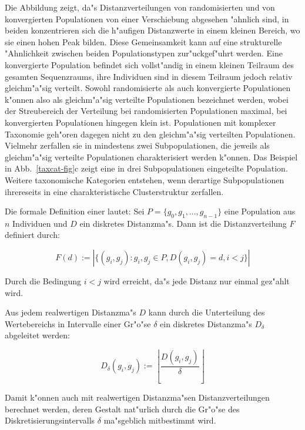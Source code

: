 Die Abbildung zeigt, da"s Distanzverteilungen von randomisierten und von konvergierten Populationen
von einer Verschiebung abgesehen "ahnlich sind, in beiden konzentrieren sich die h"aufigen Distanzwerte
in einem kleinen Bereich, wo sie einen hohen Peak bilden. Diese Gemeinsamkeit kann auf eine strukturelle
"Ahnlichkeit zwischen beiden Populationstypen zur"uckgef"uhrt werden. Eine konvergierte Population befindet
sich vollst"andig in einem kleinen Teilraum des gesamten Sequenzraums, ihre Individuen sind in diesem Teilraum jedoch
relativ gleichm"a"sig verteilt. Sowohl randomisierte als auch konvergierte Populationen k"onnen also als
gleichm"a"sig verteilte Populationen bezeichnet werden, wobei der Streubereich der Verteilung bei
randomisierten Populationen maximal, bei konvergierten Populationen hingegen klein ist. Populationen mit
komplexer Taxonomie geh"oren dagegen nicht zu den gleichm"a"sig verteilten Populationen. Vielmehr zerfallen
sie in mindestens zwei Subpopulationen, die jeweils als gleichm"a"sig verteilte Populationen charakterisiert
werden k"onnen. Das Beispiel in Abb.\ \ref{taxcat-fig}c zeigt eine in drei Subpopulationen eingeteilte
Population. Weitere taxonomische Kategorien entstehen, wenn derartige Subpopulationen ihrereseits in eine
charakteristische Clusterstruktur zerfallen.

Die formale Definition einer  lautet:
Sei $P = \{g_0, g_1, \ldots , g_{n-1}\}$ eine Population aus $n$ Individuen
und $D$ ein diskretes Distanzma"s. Dann ist die Distanzverteilung $F$ definiert
durch:

\begin{equation}
\label{ddistr-eq}
F(d) := | \{(g_i, g_j) : g_i, g_j \in P, D(g_i, g_j) = d, i < j\} |
\end{equation}

Durch die Bedingung $i < j$ wird erreicht, da"s jede Distanz nur
einmal gez"ahlt wird.

Aus jedem realwertigen Distanzma"s $D$ kann durch die Unterteilung des Wertebereichs
in Intervalle einer Gr"o"se $\delta$ ein diskretes Distanzma"s $D_{\delta}$
abgeleitet werden:

\begin{equation}
D_{\delta}(g_i, g_j) := \left\lfloor \frac{D(g_i, g_j)}{\delta} \right\rfloor
\end{equation}

Damit k"onnen auch mit realwertigen Distanzma"sen Distanzverteilungen
berechnet werden, deren Gestalt nat"urlich durch die Gr"o"se des
Diskretisierungsintervalls $\delta$ ma"sgeblich mitbestimmt wird.


